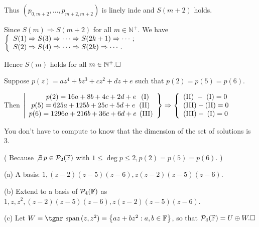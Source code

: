 \documentclass[a4paper, 11pt, UTF8]{article}
\def\Spn{{\textup{\tgnr span}}\,}
\def\Fbb{{\mathbb{F}}}
\def\Nbp{{\mathbb{N}^+}}
\begin{document}
\begin{large}
Thus $(p_{0,m+2},\dots,p_{m+2,m+2})$ is linely inde and $S(m+2)$ holds.\vspace{6pt}\par\quad
Since $S(m)\Rightarrow S(m+2)$ for all $m\in\Nbp.$ We have $\MathLeftBrace{l}{S(1)\Rightarrow S(3)\Rightarrow\cdots\Rightarrow S(2k+1)\Rightarrow \cdots;\\S(2)\Rightarrow S(4)\Rightarrow\cdots\Rightarrow S(2k)\Rightarrow\cdots.}$\par\quad
Hence $S(m)$ holds for all $m\in\Nbp.\hfill\square$\par
\SepLine\par

Suppose $p(z)=az^4+bz^3+cz^2+dz+e$ such that $p(2)=p(5)=p(6)$.\vspace{4pt}\par\quad
Then $\left|\begin{array}{r}
	p(2)=16a+8b+4c+2d+e\,\;\;(\TXT{I})\;\;\\
	p(5)=625a+125b+25c+5d+e\;\;(\TXT{II})\,\;\\
	p(6)=1296a+216b+36c+6d+e\;\,(\TXT{III})
\end{array}\right\}\Rightarrow\MathLeftBrace{l}{
	(\TXT{II})\;-\;(\TXT{I})=0\\
	(\TXT{III})-(\TXT{II})=0\\
	(\TXT{III})-\;(\TXT{I})=0\\
}$\vspace{4pt}\par\quad
{\tgsl You don't have to compute to know that the dimension of the set of solutions is 3.}\par\quad
( Because $\not\exists\,p\in\PoF{2}$ with $1\leq\deg p\leq 2,p(2)=p(5)=p(6).$ )\par\quad
(a) A basis: $1,(z-2)(z-5)(z-6),z(z-2)(z-5)(z-6).$\par\quad
(b) Extend to a basis of $\PoF{4}$ as $1,z,z^2,(z-2)(z-5)(z-6),z(z-2)(z-5)(z-6).$\par\quad
(c) Let $W=\Spn(z,z^2)=\left\{az+bz^2:a,b\in\Fbb\right\}$, so that $\PoF{4}=U\oplus W.\hfill\square$\par
\SepLine\par


\end{large}
\end{document}

